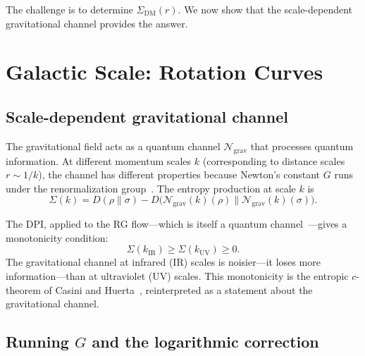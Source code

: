 \documentclass[prd,twocolumn,superscriptaddress,longbibliography,floatfix]{revtex4-2}
\newcommand{\chan}{\mathcal{N}}
\newcommand{\KL}{D}
\begin{document}
The challenge is to determine $\Sigma_{\mathrm{DM}}(r)$.
We now show that the scale-dependent gravitational channel
provides the answer.

\section{Galactic Scale: Rotation Curves}
\label{sec:galactic}

\subsection{Scale-dependent gravitational channel}

The gravitational field acts as a quantum channel
$\chan_{\mathrm{grav}}$ that processes quantum information.
At different momentum scales $k$ (corresponding to distance
scales $r \sim 1/k$), the channel has different properties
because Newton's constant $G$ runs under the renormalization
group~\cite{Reuter2004,Donoghue1994}.  The entropy production
at scale $k$ is
\begin{equation}
\Sigma(k) = \KL(\rho\|\sigma) -
\KL\!\big(\chan_{\mathrm{grav}}(k)(\rho)
\big\|\chan_{\mathrm{grav}}(k)(\sigma)\big).
\label{eq:sigma_k}
\end{equation}

The DPI, applied to the RG flow---which is itself a quantum
channel~\cite{CasiniHuerta2017}---gives a monotonicity
condition:
\begin{equation}
\Sigma(k_{\mathrm{IR}}) \geq \Sigma(k_{\mathrm{UV}}) \geq 0.
\label{eq:sigma_mono}
\end{equation}
The gravitational channel at infrared (IR) scales is
noisier---it loses more information---than at ultraviolet (UV)
scales.  This monotonicity is the entropic $c$-theorem
of Casini and Huerta~\cite{CasiniHuerta2012}, reinterpreted
as a statement about the gravitational channel.

\subsection{Running $G$ and the logarithmic correction}
\end{document}
